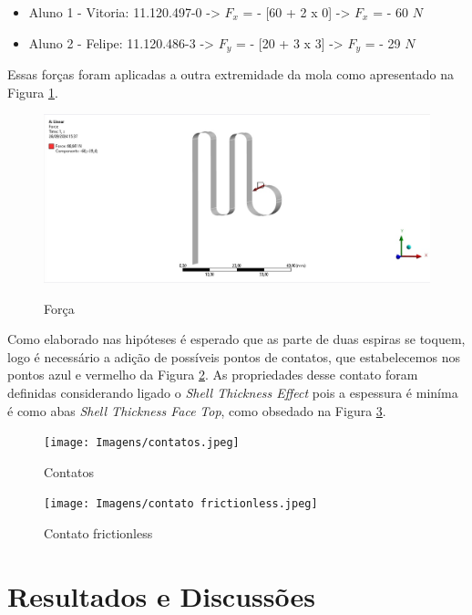 \documentclass[acronym,symbols]{fei}
\begin{document}
\begin{itemize}
    \item Aluno 1 - Vitoria: 11.120.497-0 -> $F_x$ = - [60 + 2 x 0] -> $F_x$ = - 60 $N$
    \item Aluno 2 - Felipe: 11.120.486-3 -> $F_y$ = - [20 + 3 x 3] -> $F_y$ = - 29 $N$
\end{itemize}

Essas forças foram aplicadas a outra extremidade da mola como apresentado na Figura \ref{fig: força}.

\begin{figure}[!htb]
    \centering
    \caption{Força}
    \includegraphics[width=1\linewidth]{Imagens/força.jpeg}
    \label{fig: força}
\end{figure}

Como elaborado nas hipóteses é esperado que as parte de duas espiras se toquem, logo é necessário a adição de possíveis pontos de contatos, que estabelecemos nos pontos azul e vermelho da Figura \ref{fig: contatos}. As propriedades desse contato foram definidas considerando ligado o \textit{Shell Thickness Effect} pois a espessura é miníma é como abas \textit{Shell Thickness Face} \textit{Top}, como obsedado na Figura \ref{fig: contato frictionless}.

\begin{figure}[!htb]
    \centering
    \caption{Contatos}
    \texttt{[image: Imagens/contatos.jpeg]}
    \label{fig: contatos}
\end{figure}

\begin{figure}[!htb]
    \centering
    \caption{Contato frictionless}
    \texttt{[image: Imagens/contato frictionless.jpeg]}
    \label{fig: contato frictionless}
\end{figure}


\chapter{Resultados e Discussões}
\end{document}
